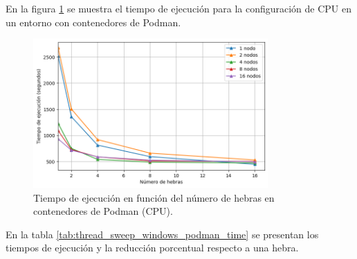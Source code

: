 En la figura \ref{fig:thread_sweep_windows_podman_time} se muestra el tiempo de ejecución para la configuración de CPU en un entorno con contenedores de Podman.

\begin{figure}[H]
    \centering
    \includegraphics[width=0.8\textwidth]{imagenes/cap5/thread_sweep_windows_podman_time.png}
    \caption{Tiempo de ejecución en función del número de hebras en contenedores de Podman (CPU).}
    \label{fig:thread_sweep_windows_podman_time}
\end{figure}

En la tabla \ref{tab:thread_sweep_windows_podman_time} se presentan los tiempos de ejecución y la reducción porcentual respecto a una hebra.

